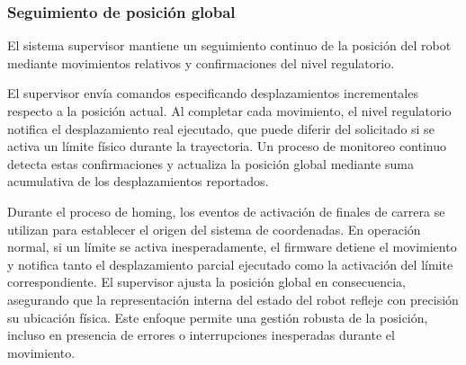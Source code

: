 \subsubsection{Seguimiento de posición global}

El sistema supervisor mantiene un seguimiento continuo de la posición del robot mediante movimientos relativos y confirmaciones del nivel regulatorio.

El supervisor envía comandos especificando desplazamientos incrementales respecto a la posición actual. Al completar cada movimiento, el nivel regulatorio notifica el desplazamiento real ejecutado, que puede diferir del solicitado si se activa un límite físico durante la trayectoria. Un proceso de monitoreo continuo detecta estas confirmaciones y actualiza la posición global mediante suma acumulativa de los desplazamientos reportados.

Durante el proceso de homing, los eventos de activación de finales de carrera se utilizan para establecer el origen del sistema de coordenadas. En operación normal, si un límite se activa inesperadamente, el firmware detiene el movimiento y notifica tanto el desplazamiento parcial ejecutado como la activación del límite correspondiente.
El supervisor ajusta la posición global en consecuencia, asegurando que la representación interna del estado del robot refleje con precisión su ubicación física. Este enfoque permite una gestión robusta de la posición, incluso en presencia de errores o interrupciones inesperadas durante el movimiento.
